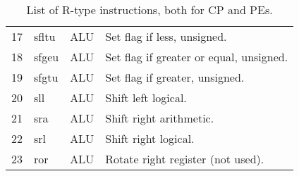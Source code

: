\begin{table}[h]
\begin{center}
\begin{tabular}{@{}p{}p{}p{}p{}@{}}
17 & sfltu & ALU	& Set flag if less, unsigned. \\ 
18 & sfgeu & ALU	& Set flag if greater or equal, unsigned. \\ 
19 & sfgtu & ALU	& Set flag if greater, unsigned. \\ 
20 & sll & ALU	& Shift left logical. \\ 
21 & sra & ALU	& Shift right arithmetic. \\ 
22 & srl & ALU	& Shift right logical. \\ 
23 & ror & ALU 	& Rotate right register (not used). \\ 
\bottomrule
\end{tabular}
\end{center}
\caption{List of R-type instructions, both for CP and PEs.}
\label{table:r_ops}
\end{table}%

